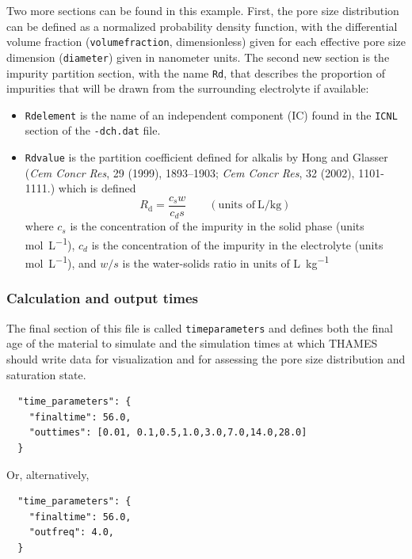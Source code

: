 \documentclass{article}
\newcommand{\us}{\underline{\phantom{X}}}
\begin{document}
{\normalsize{ }
Two more sections can be found in this example. First, the pore size
distribution can be defined as a normalized probability density function,
with the differential volume fraction (\verb!volumefraction!, dimensionless)
given for each effective pore size dimension (\verb!diameter!) given in
nanometer units. The second new section is the impurity partition section,
with the name \verb!Rd!, that describes the proportion of impurities that will
be drawn from the surrounding electrolyte if available:
\begin{itemize}
	\item \verb!Rdelement! is the name of an independent component (IC)
	      found in the \verb!ICNL! section of the \verb!-dch.dat! file.
	\item \verb!Rdvalue! is the partition coefficient defined for
	      alkalis by Hong and Glasser (\textit{Cem Concr Res}, 29 (1999), 1893--1903;
	      \textit{Cem Concr Res}, 32 (2002), 1101-1111.) which is defined
	      \begin{equation}
		      R_\text{d} = \frac{c_s w}{c_d s} \qquad (\text{units of}\
		      \unit{\liter\per\kilo\gram})
	      \end{equation}
	      where $c_s$ is the concentration of the impurity in the solid phase
	      (units \unit{\mole\per\liter}), $c_d$ is the concentration of the impurity
	      in the electrolyte (units \unit{\mole\per\liter}), and $w/s$ is the
	      water-solids ratio in units of \unit{\liter\per\kilo\gram}
\end{itemize}

\subsubsection{\label{sec:timeparams} Calculation and output times}
The final section of this file is called \texttt{time{\us}parameters} and defines
both the final age of the material to simulate and the simulation times at
which THAMES should write data for visualization and for assessing the
pore size distribution and saturation state.

\scriptsize{
	\begin{lstlisting}
  "time_parameters": {
    "finaltime": 56.0,
    "outtimes": [0.01, 0.1,0.5,1.0,3.0,7.0,14.0,28.0]
  }
\end{lstlisting}
}

Or, alternatively,

\scriptsize{
	\begin{lstlisting}
  "time_parameters": {
    "finaltime": 56.0,
    "outfreq": 4.0,
  }
\end{lstlisting}
}

}
\end{document}
